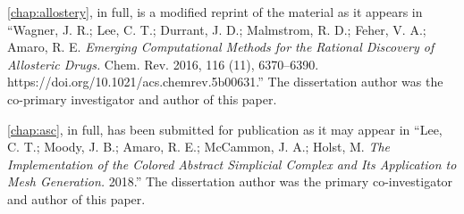 \begin{frontmatter}
\begin{acknowledgements}
\par \cref{chap:allostery}, in full, is a modified reprint of the material as it appears in ``Wagner, J. R.; Lee, C. T.; Durrant, J. D.; Malmstrom, R. D.; Feher, V. A.; Amaro, R. E. \emph{Emerging Computational Methods for the Rational Discovery of Allosteric Drugs.} Chem. Rev. 2016, 116 (11), 6370–6390. https://doi.org/10.1021/acs.chemrev.5b00631.''
The dissertation author was the co-primary investigator and author of this paper.

\par \cref{chap:asc}, in full, has been submitted for publication as it may appear in
``Lee, C. T.; Moody, J. B.; Amaro, R. E.; McCammon, J. A.; Holst, M. \emph{The Implementation of the Colored Abstract Simplicial Complex and Its Application to Mesh Generation.} 2018.''
The dissertation author was the primary co-investigator and author of this paper.
\end{acknowledgements}



\end{frontmatter}
